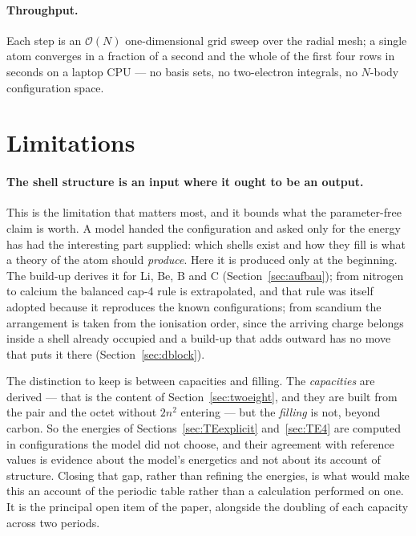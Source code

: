 \documentclass[11pt]{article}
\begin{document}
\paragraph{Throughput.} Each step is an $\mathcal{O}(N)$ one-dimensional grid sweep over
the radial mesh; a single atom converges in a fraction of a second and the whole
of the first four rows in seconds on a laptop CPU --- no basis sets, no two-electron
integrals, no $N$-body configuration space.

\section{Limitations}\label{sec:limitations}

\paragraph{The shell structure is an input where it ought to be an output.} This is the limitation
that matters most, and it bounds what the parameter-free claim is worth. A model handed the
configuration and asked only for the energy has had the interesting part supplied: which shells exist
and how they fill is what a theory of the atom should \emph{produce}. Here it is produced only at the
beginning. The build-up derives it for Li, Be, B and C (Section~\ref{sec:aufbau}); from nitrogen to
calcium the balanced cap-4 rule is extrapolated, and that rule was itself adopted because it
reproduces the known configurations; from scandium the arrangement is taken from the ionisation
order, since the arriving charge belongs inside a shell already occupied and a build-up that adds
outward has no move that puts it there (Section~\ref{sec:dblock}).

The distinction to keep is between capacities and filling. The \emph{capacities} are derived --- that
is the content of Section~\ref{sec:twoeight}, and they are built from the pair and the octet without
$2n^2$ entering --- but the \emph{filling} is not, beyond carbon. So the energies of
Sections~\ref{sec:TEexplicit} and~\ref{sec:TE4} are computed in configurations the model did not
choose, and their agreement with reference values is evidence about the model's energetics and not
about its account of structure. Closing that gap, rather than refining the energies, is what would
make this an account of the periodic table rather than a calculation performed on one. It is the
principal open item of the paper, alongside the doubling of each capacity across two periods.
\end{document}
